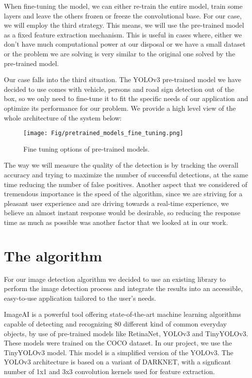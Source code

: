 \documentclass[runningheads,a4paper,11pt]{report}
\begin{document}
When fine-tuning the model, we can either re-train the entire model, train some layers and leave the others frozen or freeze the convolutional base. For our case, we will employ the third strategy. This means, we will use the pre-trained model as a fixed feature extraction mechanism. This is useful in cases where, either we don't have much computational power at our disposal or we have a small dataset or the problem we are solving is very similar to the original one solved by the pre-trained model. 

Our case falls into the third situation. The YOLOv3 pre-trained model we have decided to use comes with vehicle, persons and road sign detection out of the box, so we only need to fine-tune it to fit the specific needs of our application and optimize its performance for our problem. We provide a high level view of the whole architecture of the system below:

\begin{figure}[htbp]
	\centerline{\texttt{[image: Fig/pretrained\_models\_fine\_tuning.png]}}
	\caption{Fine tuning options of pre-trained models. \cite{Transfer26:online}}
	\label{fig:preTrainedModelsFineTuning}
\end{figure}

The way we will measure the quality of the detection is by tracking the overall accuracy and trying to maximize the number of successful detections, at the same time reducing the number of false positives. Another aspect that we considered of tremendous importance is the speed of the algorithm, since we are striving for a pleasant user experience and are driving towards a real-time experience, we believe an almost instant response would be desirable, so reducing the response time as much as possible was another factor that we looked at in our work.


\section{The algorithm}

For our image detection algorithm we decided to use an existing library to perform the image detection process and integrate the results into an accessible, easy-to-use application tailored to the user's needs.

ImageAI \cite{Official73:online} is a powerful tool offering state-of-the-art machine learning algorithms capable of detecting and recognizing 80 different kind of common everyday objects, by use of pre-trained models like RetinaNet, YOLOv3 and TinyYOLOv3. These models were trained on the COCO dataset. 
In our project, we use the TinyYOLOv3 \cite{yolov3} model. This model is a simplified version of the YOLOv3. The YOLOv3 architecture is based on a variant of DARKNET, with a signficant number of 1x1 and 3x3 convolution kernels used for feature extraction. 
\end{document}
